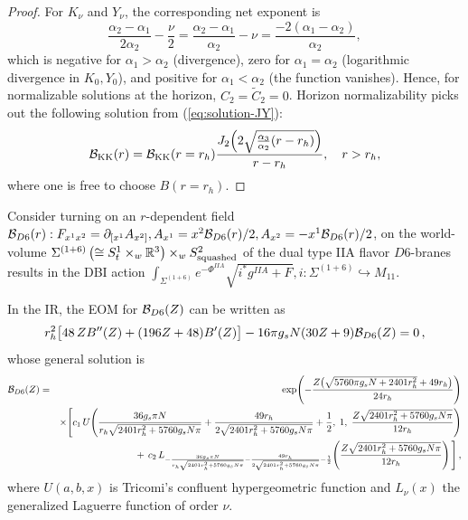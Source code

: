 \documentclass[a4paper,11pt,fleqn]{article}
\theoremstyle{plain}
\theoremstyle{definition}
\newcommand{\rh}{r_h}
\newcommand{\anu}{\alpha_1}
\newcommand{\ade}{\alpha_2}
\newcommand{\ath}{\alpha_3}
\begin{document}
\begin{proof}
For $K_\nu$ and $Y_\nu$, the corresponding net exponent is
\begin{equation}
\frac{\ade-\anu}{2\ade} - \frac{\nu}{2} = \frac{\ade-\anu}{\ade} - \nu
= \frac{-2(\anu - \ade)}{\ade},
\label{eq:Kexponent}
\end{equation}
which is negative for $\anu > \ade$ (divergence), zero for $\anu =
\ade$ (logarithmic divergence in $K_0, Y_0$), and positive for
$\anu < \ade$ (the function vanishes). Hence, for normalizable solutions at the horizon, $C_2 = \tilde{C}_2=0$. Horizon normalizability picks out the following solution from (\ref{eq:solution-JY}):
\begin{equation}
{\cal B}_{\rm KK}(r) = {\cal B}_{\rm KK}(r=r_h) \frac{J_2\!\left(2\sqrt{\frac{\ath}{\ade}(r-\rh)}\right)}{r - r_h},
\quad r > \rh,
\label{eq:solution-final}
\end{equation}
where one is free to choose $B(r=r_h)$.
\end{proof}

Consider turning on an $r$-dependent field ${\cal B}_{D6}(r): F_{x^1x^2} = \partial_{[x^1}A_{x^2]}, A_{x^1} = x^2 {\cal B}_{D6}(r)/2, A_{x^2} = - x^1{\cal B}_{D6}(r)/2$, on the world-volume $\Sigma^{(1+6)}\left(\cong S^1_t\times_w\mathbb{R}^3\right)\times_w S^2_{\rm squashed}$ of the dual type IIA flavor $D6$-branes results in the DBI action $\int_{\Sigma^{(1+6)}}e^{-\Phi^{IIA}}\sqrt{i^*g^{IIA} + F}, i:\Sigma^{(1+6)}\hookrightarrow M_{11}$.

In the IR, the EOM for ${\cal B}_{D6}(Z)$ can be written as
\begin{equation}
\label{IR-EOM-BD6}
 r_h^{2}\big[48\,Z B''(Z) + (196 Z+48) B'(Z)\big]
- 16\pi g_s N (30Z+9) {\cal B}_{D6}(Z) = 0 \, ,
\end{equation}
whose general solution is
{\footnotesize
\begin{eqnarray}
{\cal B}_{D6}(Z) &=& \exp\!\left(-\frac{Z\big(\sqrt{5760\pi g_sN + 2401 r_h^2} + 49 r_h\big)}{24 r_h}\right) \nonumber\\
&&\times\Bigg[c_1\, U\!\left(\frac{36 g_s\pi N}{r_h\sqrt{2401 r_h^2+5760 g_sN\pi}}+\frac{49 r_h}{2\sqrt{2401r_h^2+5760g_sN\pi}}+\frac12,\;1,\;\frac{Z\sqrt{2401 r_h^2+5760 g_sN\pi}}{12 r_h}\right) \nonumber\\
&&\hphantom{\times\Bigg[}+\,c_2\, L_{-\frac{36 g_s\pi N}{r_h\sqrt{2401 r_h^2+5760g_sN\pi}}-\frac{49 r_h}{2\sqrt{2401r_h^2+5760g_sN\pi}}-\frac12}\!\left(\frac{Z\sqrt{2401 r_h^2+5760g_sN\pi}}{12 r_h}\right)\Bigg] \, ,
\end{eqnarray}
}
where $U(a,b,x)$ is Tricomi's confluent hypergeometric function and $L_\nu(x)$ the generalized Laguerre function of order $\nu$.
\end{document}
